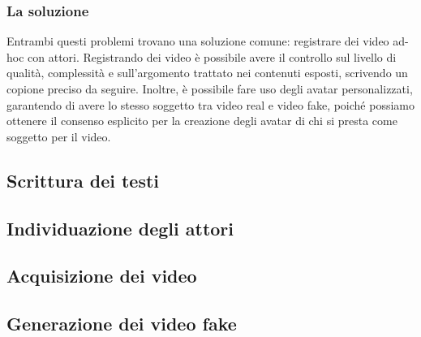 \subsubsection{La soluzione}

Entrambi questi problemi trovano una soluzione comune: registrare dei video ad-hoc con attori. Registrando dei video è possibile avere il controllo sul livello di qualità, complessità e sull'argomento trattato nei contenuti esposti, scrivendo un copione preciso da seguire. Inoltre, è possibile fare uso degli avatar personalizzati, garantendo di avere lo stesso soggetto tra video real e video fake, poiché possiamo ottenere il consenso esplicito per la creazione degli avatar di chi si presta come soggetto per il video.

\subsection{Scrittura dei testi}

\subsection{Individuazione degli attori}

\subsection{Acquisizione dei video}

\subsection{Generazione dei video fake}

\clearpage